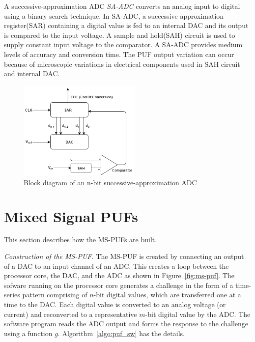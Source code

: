 A successive-approximation ADC {\em SA-ADC} converts an analog
input to digital using a binary search technique.
In SA-ADC, a successive approximation register(SAR) containing 
a digital value is fed to an internal DAC and its output is 
compared to the input voltage. A sample and hold(SAH) circuit 
is used to supply constant input voltage to the comparator. 
A SA-ADC provides medium levels of accuracy and conversion time. 
The PUF output variation can occur because of microscopic variations 
in electrical components used in SAH circuit and internal DAC.
\begin{figure}[h]
\includegraphics[width=6cm]{SA-ADC.png}
\centering
\caption{Block diagram of an n-bit successive-approximation ADC}
\end{figure}


\section{Mixed Signal PUFs}
This section describes how the MS-PUFs are built.

{\flushleft \em Construction of the MS-PUF. }
The MS-PUF is created by connecting an output of a DAC to an
input channel of an ADC. This creates a loop between the processor
core, the DAC, and the ADC as shown in Figure~\ref{fig:ms-puf}.
The sofware running on the processor core 
generates a challenge in the form of a time-series pattern
comprising of $n$-bit digital values, which are transferred one at a time
to the DAC. Each digital value is converted to an analog voltage (or
current) and reconverted to a representative $m$-bit digital value by the ADC.
The software program reads the
ADC output and forms the response to the challenge using a function $g$.
Algorithm~\ref{algo:puf_sw} has the details.

